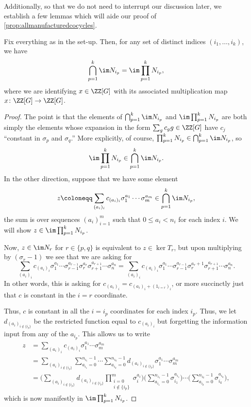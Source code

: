 \documentclass{article}
\numberwithin{equation}{section}
\begin{document}
Additionally, so that we do not need to interrupt our discussion later, we establish a few lemmas which will aide our proof of \autoref{prop:allmanufacturedcocycles}.
\begin{lemma} \label{lem:separatenijs}
	Fix everything as in the set-up. Then, for any set of distinct indices $(i_1,\ldots,i_k)$, we have
	\[\bigcap_{p=1}^k\im N_{i_p}=\im\prod_{p=1}^kN_{i_p},\]
	where we are identifying $x\in\ZZ[G]$ with its associated multiplication map $x\colon\ZZ[G]\to\ZZ[G]$.
\end{lemma}
\begin{proof}
	The point is that the elements of $\bigcap_{p=1}^k\im N_{i_p}$ and $\im\prod_{p=1}^kN_{i_p}$ are both simply the elements whose expansion in the form $\sum_gc_gg\in\ZZ[G]$ have $c_j$ ``constant in $\sigma_p$ and $\sigma_q$.'' More explicitly, of course, $\prod_{p=1}^kN_{i_p}\in\bigcap_{p=1}^k\im N_{i_p}$, so
	\[\im\prod_{p=1}^kN_{i_p}\in\bigcap_{p=1}^k\im N_{i_p}.\]
	In the other direction, suppose that we have some element
	\[z\coloneqq\sum_{(a_i)_i}c_{(a_i)_i}\sigma_1^{a_1}\cdots\sigma_m^{a_m}\in\bigcap_{p=1}^k\im N_{i_p},\]
	the sum is over sequences $(a_i)_{i=1}^m$ such that $0\le a_i<n_i$ for each index $i$. We will show $z\in\im\prod_{p=1}^kN_{i_p}$.
	
	Now, $z\in\im N_r$ for $r\in\{p,q\}$ is equivalent to $z\in\ker T_r$, but upon multiplying by $(\sigma_r-1)$ we see that we are asking for
	\[\sum_{(a_i)_i}c_{(a_i)_i}\sigma_1^{a_1}\cdots\sigma_{r-1}^{a_{r-1}}\sigma_r^{a_r}\sigma_{r+1}^{a_{r+1}}\cdots\sigma_n^{a_n}=\sum_{(a_i)_i}c_{(a_i)_i}\sigma_1^{a_1}\cdots\sigma_{r-1}^{a_{r-1}}\sigma_r^{a_r+1}\sigma_{r+1}^{a_{r+1}}\cdots\sigma_n^{a_n}.\]
	In other words, this is asking for $c_{(a_i)_i}=c_{(a_i)_i+(1_{i=r})_i}$, or more succinctly just that $c$ is constant in the $i=r$ coordinate.

	Thus, $c$ is constant in all the $i=i_p$ coordinates for each index $i_p$. Thus, we let $d_{(a_i)_{i\notin\{i_p\}}}$ be the restricted function equal to $c_{(a_i)_i}$ but forgetting the information input from any of the $a_{i_p}$. This allows us to write
	\begin{align*}
		z &= \sum_{(a_i)_i}c_{(a_i)_i}\sigma_1^{a_1}\cdots\sigma_m^{a_m} \\
		&= \sum_{(a_i)_{i\notin\{i_p\}}}\sum_{a_{i_1}=0}^{n_{i_1}-1}\cdots\sum_{a_{i_k}=0}^{n_{i_k}-1}d_{(a_i)_{i\notin\{i_p\}}}\sigma_1^{a_1}\cdots\sigma_m^{a_m} \\
		&= \Bigg(\sum_{(a_i)_{i\notin\{i_p\}}}d_{(a_i)_{i\notin\{i_p\}}}\prod_{\substack{i=0\\i\notin\{i_p\}}}^m\sigma_i^{a_i}\Bigg)\Bigg(\sum_{a_{i_1}=0}^{n_{i_1}-1}\sigma_{i_1}^{a_{i_1}}\Bigg)\cdots\Bigg(\sum_{a_{i_k}=0}^{n_{i_k}-1}\sigma_{i_k}^{a_{i_k}}\Bigg),
	\end{align*}
	which is now manifestly in $\im\prod_{p=1}^kN_{i_p}$.
\end{proof}
\end{document}
